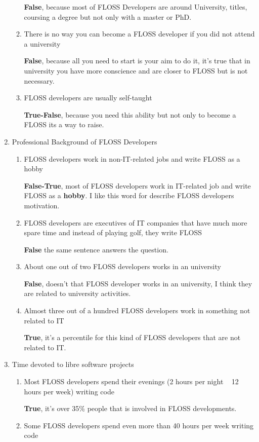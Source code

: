 \documentclass[11pt]{scrartcl}
\begin{document}
\begin{enumerate}
\begin{enumerate}
		\textbf{False}, because most of FLOSS Developers are around University, titles, coursing a degree but not only with a master or PhD.
		\item There is no way you can become a FLOSS developer if you did not attend a university
		
		\textbf{False}, because all you need to start is your aim to do it, it's true that in university you have more conscience and are closer to FLOSS but is not necessary.
		\item FLOSS developers are usually self-taught
		
		\textbf{True-False}, because you need this ability but not only to become a FLOSS its a way to raise.
	\end{enumerate}

	\item Professional Background of FLOSS Developers
	\begin{enumerate}
		\item FLOSS developers work in non-IT-related jobs and write FLOSS as a hobby
		
		\textbf{False-True}, most of FLOSS developers work in IT-related job and write FLOSS as a \textbf{hobby}. I like this word for describe FLOSS developers motivation.
		\item FLOSS developers are executives of IT companies that have much more spare time and instead of playing golf, they write FLOSS
		
		\textbf{False} the same sentence answers the question.
		\item About one out of two FLOSS developers works in an university
		
		\textbf{False}, doesn't that FLOSS developer works in an university, I think they are related to university activities.
		\item Almost three out of a hundred FLOSS developers work in something not related to IT
		
		\textbf{True}, it's a percentile for this kind of FLOSS developers that are not related to IT.
	\end{enumerate}

	\item Time devoted to libre software projects
	\begin{enumerate}
		\item Most FLOSS developers spend their evenings (2 hours per night ~ 12 hours per week) writing code
		
		\textbf{True}, it's over 35\% people that is involved in FLOSS developments.
		\item Some FLOSS developers spend even more than 40 hours per week writing code
		

\end{enumerate}
\end{enumerate}
\end{document}
